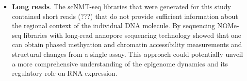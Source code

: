 \begin{itemize}
	\item \textbf{Long reads}. The scNMT-seq libraries that were generated for this study contained short reads (???) that do not provide sufficient information about the regional context of the individual DNA molecule. By sequencing NOMe-seq libraries with long-read nanopore sequencing technology \cite{Lee2018} showed that one can obtain phased methyation and chromatin accessibility measurements and structural changes from a single assay. This approach could potentially unveil a more comprehensive understanding of the epigenome dynamics and its regulatory role on RNA expression.

\end{itemize}



